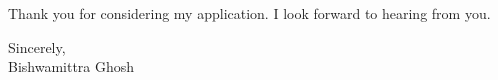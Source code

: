 \documentclass[a4paper,10pt]{article}
\begin{document}
	
	\vspace{1em}
	Thank you for considering my application. I look forward to hearing from you.
	
	\vspace{1em}
	Sincerely,\\
	Bishwamittra Ghosh	


	
	

\end{document}
